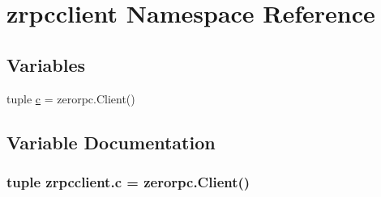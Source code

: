 \hypertarget{namespacezrpcclient}{\section{zrpcclient Namespace Reference}
\label{namespacezrpcclient}
}
\subsection*{Variables}
\begin{DoxyCompactItemize}
\item 
tuple \hyperlink{namespacezrpcclient_a039edf63871343a5809f1e216cc7e5cd}{c} = zerorpc.\+Client()
\end{DoxyCompactItemize}


\subsection{Variable Documentation}
\hypertarget{namespacezrpcclient_a039edf63871343a5809f1e216cc7e5cd}{
\subsubsection[{c}]{\setlength{\rightskip}{0pt plus 5cm}tuple zrpcclient.\+c = zerorpc.\+Client()}}\label{namespacezrpcclient_a039edf63871343a5809f1e216cc7e5cd}
